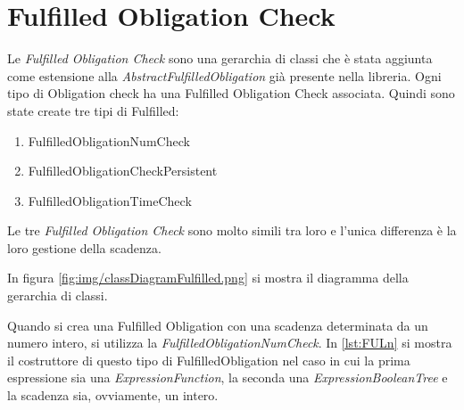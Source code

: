 \section{Fulfilled Obligation Check}
\label{sec:FulfilledObligationCheck}
Le \emph{Fulfilled Obligation Check} sono una gerarchia di classi che è stata aggiunta
come estensione alla \emph{AbstractFulfilledObligation} già presente nella libreria.
Ogni tipo di Obligation check ha una Fulfilled Obligation Check associata. Quindi sono state create
tre tipi di Fulfilled:
\begin{enumerate}
  \item FulfilledObligationNumCheck
  \item FulfilledObligationCheckPersistent
  \item FulfilledObligationTimeCheck
\end{enumerate}
Le tre \emph{Fulfilled Obligation Check} sono molto simili
tra loro e l'unica differenza è la loro gestione della scadenza.\par
In figura \ref{fig:img/classDiagramFulfilled.png} si mostra il diagramma della gerarchia di classi.

Quando si crea una Fulfilled Obligation con una scadenza determinata da un numero intero, si utilizza
la \emph{FulfilledObligationNumCheck}. In \ref{lst:FULn} si mostra il costruttore di questo tipo di
FulfilledObligation nel caso in cui la prima espressione sia una \emph{ExpressionFunction}, la seconda
una \emph{ExpressionBooleanTree} e la scadenza sia, ovviamente, un intero.

